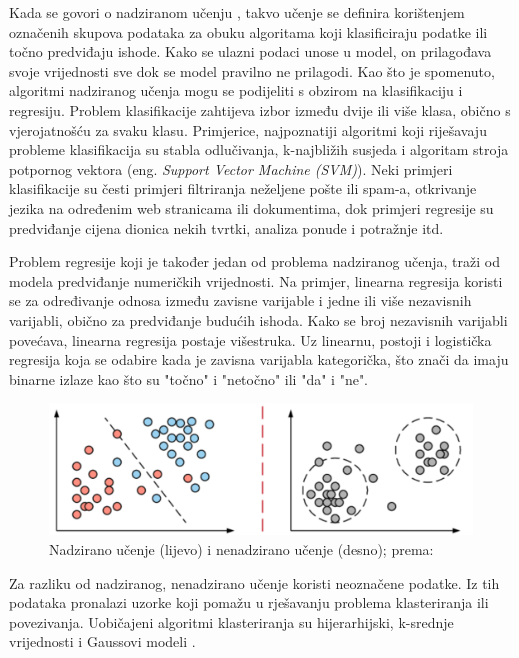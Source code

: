 \documentclass[]{foi} %
\begin{document}
Kada se govori o nadziranom učenju \cite{tds1}, takvo učenje se definira korištenjem označenih skupova podataka za obuku algoritama koji klasificiraju podatke ili točno predviđaju ishode. Kako se ulazni podaci unose u model, on prilagođava svoje vrijednosti sve dok se model pravilno ne prilagodi. Kao što je spomenuto, algoritmi nadziranog učenja mogu se podijeliti s obzirom na klasifikaciju i regresiju. Problem klasifikacije \cite{tds1} zahtijeva izbor između dvije ili više klasa, obično s vjerojatnošću za svaku klasu. Primjerice, najpoznatiji algoritmi \cite[str. 137]{deep} koji riješavaju probleme klasifikacija su stabla odlučivanja, k-najbližih susjeda i algoritam stroja potpornog vektora (eng. \textit{Support Vector Machine (SVM)}).
Neki primjeri \cite{tds2} klasifikacije su česti primjeri filtriranja neželjene pošte ili spam-a, otkrivanje jezika na određenim web stranicama ili dokumentima, dok primjeri regresije su predviđanje cijena dionica nekih tvrtki, analiza ponude i potražnje itd.

Problem regresije koji je također jedan od problema nadziranog učenja, traži od modela predviđanje numeričkih vrijednosti. Na primjer, linearna regresija \cite[str. 105, 106]{deep} koristi se za određivanje odnosa između zavisne varijable i jedne ili više nezavisnih varijabli, obično za predviđanje budućih ishoda. Kako se broj nezavisnih varijabli povećava, linearna regresija postaje višestruka. Uz linearnu, postoji i logistička regresija koja se odabire kada je zavisna varijabla kategorička, što znači da imaju binarne izlaze kao što su "točno" i "netočno" ili "da" i "ne".

\begin{figure}[!ht]
    \centering
    \includegraphics[width=1\textwidth]{slike/nvsnn.png}
    \caption{Nadzirano učenje (lijevo) i nenadzirano učenje (desno); prema: \cite{deep}}
    \label{fig:nvsnn}
\end{figure}

Za razliku od nadziranog, nenadzirano učenje \cite{tds1, deep} koristi neoznačene podatke. Iz tih podataka pronalazi uzorke koji pomažu u rješavanju problema klasteriranja ili povezivanja. Uobičajeni algoritmi klasteriranja su hijerarhijski, k-srednje vrijednosti i Gaussovi modeli \cite[str. 142]{deep}.
\end{document}
